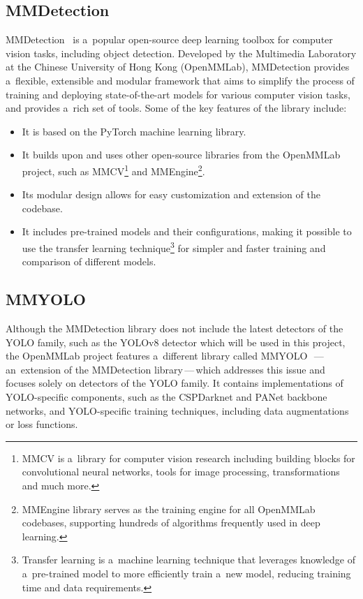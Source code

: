 \subsection{MMDetection}

MMDetection~\cite{MMDetection} is a~popular open-source deep learning toolbox
for computer vision tasks, including object detection. Developed by the
Multimedia Laboratory at the Chinese University of Hong Kong (OpenMMLab),
MMDetection provides a~flexible, extensible and modular framework that aims to
simplify the process of training and deploying state-of-the-art models for
various computer vision tasks, and provides a~rich set of tools. Some of the key
features of the library include:

\begin{itemize}
    \item It is based on the PyTorch machine learning library.
    \item It builds upon and uses other open-source libraries from the OpenMMLab
    project, such as MMCV\footnote{MMCV is a~library for computer vision
    research including building blocks for convolutional neural networks, tools
    for image processing, transformations and much more.} and
    MMEngine\footnote{MMEngine library serves as the training engine for all
    OpenMMLab codebases, supporting hundreds of algorithms frequently used in
    deep learning.}.
    \item Its modular design allows for easy customization and extension
    of the codebase.
    \item It includes pre-trained models and their configurations, making it
    possible to use the transfer learning technique\footnote{Transfer learning
    is a~machine learning technique that leverages knowledge of a~pre-trained
    model to more efficiently train a~new model, reducing training time and data
    requirements.} for simpler and faster training and comparison of different
    models.
\end{itemize}


\subsection{MMYOLO}

Although the MMDetection library does not include the latest detectors of the
YOLO family, such as the YOLOv8 detector which will be used in this project, the
OpenMMLab project features a~different library called
MMYOLO~\cite{MMYOLO}\,---\,an~extension of the MMDetection library\,---\,which
addresses this issue and focuses solely on detectors of the YOLO family. It
contains implementations of YOLO-specific components, such as the CSPDarknet and
PANet backbone networks, and YOLO-specific training techniques, including data
augmentations or loss functions.


